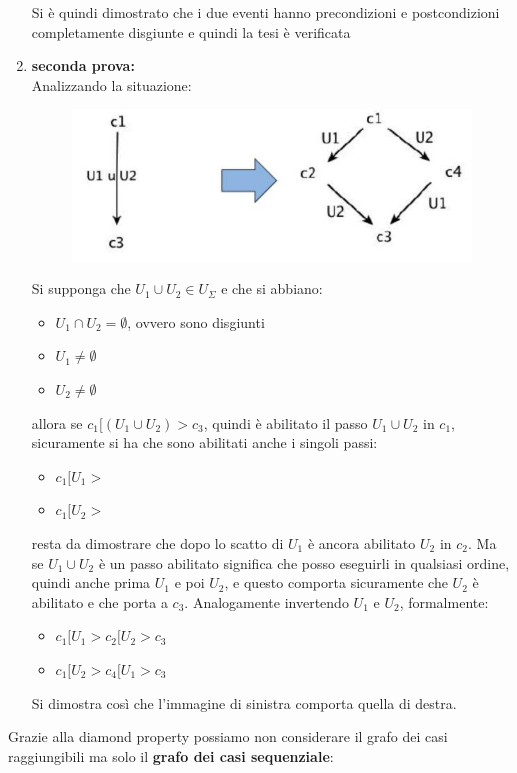 \documentclass[a4paper,12pt, oneside]{book}
\begin{document}
\begin{enumerate}
  Si è quindi dimostrato che i due eventi hanno precondizioni e postcondizioni
  completamente disgiunte e quindi la tesi è verificata
  \item \textbf{seconda prova:}\\
  Analizzando la situazione:
  \begin{figure}[H]
    \centering
    \includegraphics[scale = 0.45]{img/diam2.jpg}
  \end{figure}
  \newpage
  Si supponga che $U_1\cup U_2\in U_\Sigma$ e che si abbiano:
  \begin{itemize}
    \item $U_1\cap U_2=\emptyset$, ovvero sono disgiunti
    \item $U_1\neq\emptyset$
    \item $U_2\neq\emptyset$
  \end{itemize}
  allora se $c_1[(U_1\cup U_2)>c_3$, quindi è abilitato il passo $U_1\cup U_2$
  in $c_1$, sicuramente si ha che sono abilitati anche i singoli passi:
  \begin{itemize}
    \item $c_1[U_1>$
    \item $c_1[U_2>$
  \end{itemize}
  resta da dimostrare che dopo lo scatto di $U_1$ è ancora abilitato $U_2$ in
  $c_2$. Ma se $U_1\cup U_2$ è un passo abilitato significa che posso eseguirli
  in qualsiasi ordine, quindi anche prima $U_1$ e poi $U_2$, e questo comporta
  sicuramente che $U_2$ è abilitato e che porta a $c_3$. Analogamente invertendo
  $U_1$ e $U_2$, formalmente: 
  \begin{itemize}
    \item $c_1[U_1>c_2[U_2>c_3$
    \item $c_1[U_2>c_4[U_1>c_3$
  \end{itemize}
  Si dimostra così che l'immagine di sinistra comporta quella di destra.
\end{enumerate}
Grazie alla diamond property possiamo non considerare il grafo dei casi
raggiungibili ma solo il \textbf{grafo dei casi sequenziale}:
\end{document}
